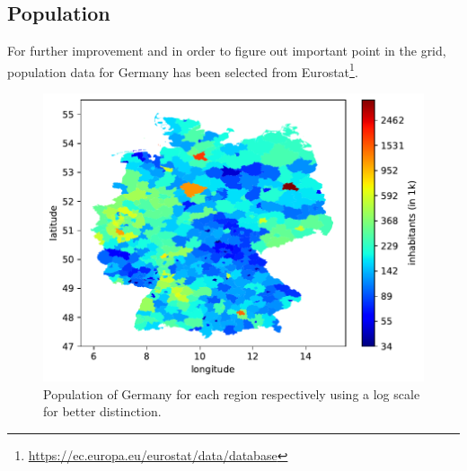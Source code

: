 \subsection{Population}

For further improvement and in order to figure out important point in the grid, population data for Germany has been  selected from Eurostat\footnote{\url{https://ec.europa.eu/eurostat/data/database}}.\\

\begin{figure}[h!]%
\centering
\includegraphics[width=\textwidth]{plots/demo/demo2018_logscale}%
\caption{Population of Germany for each region respectively using a log scale for better distinction.}%
\label{fig:demo2018_logscale}%
\end{figure}




